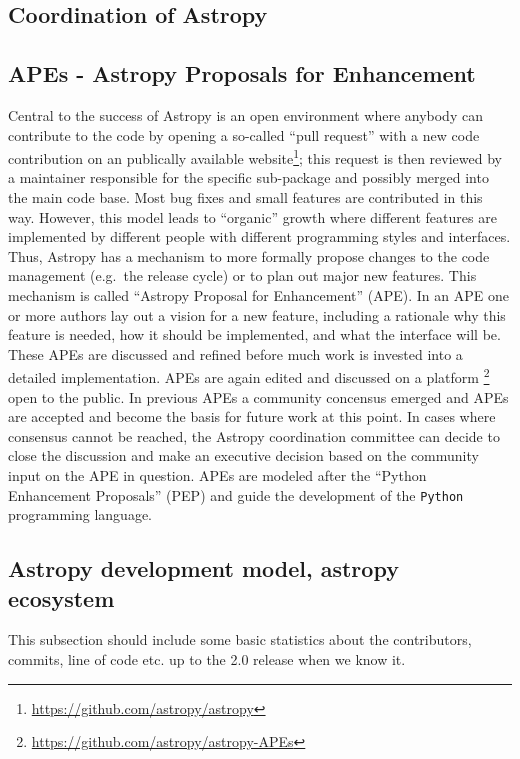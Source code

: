 \documentclass[modern]{aastex61}
\newcommand{\package}[1]{\texttt{#1}\xspace}
\newcommand{\python}{\package{Python}\xspace}
\newcommand{\astropy}{Astropy\xspace}
\begin{document}
\subsection{Coordination of Astropy}

\subsection{APEs - Astropy Proposals for Enhancement}
Central to the success of \astropy is an open environment where
anybody can contribute to the code by opening a so-called ``pull
request'' with a new code contribution on an publically available
website\footnote{\url{https://github.com/astropy/astropy}}; this
request is then reviewed by a maintainer responsible for the specific
sub-package and possibly merged into the main code base. Most bug
fixes and small features are contributed in this way. However, this
model leads to ``organic'' growth where different features are
implemented by different people with different programming styles and
interfaces. Thus, \astropy has a mechanism to more formally propose
changes to the code management (e.g.~the release cycle) or to plan
out major new features. This mechanism is called ``Astropy Proposal
for Enhancement'' (APE). In an APE one or more authors lay out a
vision for a new feature, including a rationale why this feature is
needed, how it should be implemented, and what the interface will
be. These APEs are discussed and refined before much work is invested
into a detailed implementation. APEs are again edited and discussed on
a platform \footnote{\url{https://github.com/astropy/astropy-APEs}}
open to the public. In previous APEs a community concensus emerged and
APEs are accepted and become the basis for future work at this
point. In cases where consensus cannot be reached, the
\astropy coordination committee can decide to close the discussion and
make an executive decision based on the community input on the APE in
question. APEs are modeled after the ``Python Enhancement Proposals''
(PEP) and guide the development of the \python programming language.


\subsection{Astropy development model, astropy ecosystem}
This subsection should include some basic statistics about the contributors, commits, line of code etc. up to the 2.0 release when we know it.
\end{document}
